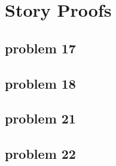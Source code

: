 \section{Story Proofs}

\subsection{problem 17}


\subsection{problem 18}


\subsection{problem 21}


\subsection{problem 22}
